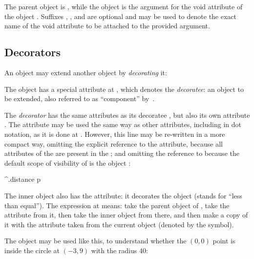 The parent object is , while the object 
is the argument for the void attribute  of the object .
Suffixes , , and  are optional and may be used
to denote the exact name of the void attribute to be attached to the
provided argument.

\subsection{Decorators}

An object may extend another object by \emph{decorating} it:


The object  has a special attribute 
at , which denotes
the \emph{decoratee}: an object to be extended,
also referred to as ``component'' by~\citet{gamma1994design}.

The \emph{decorator} 
has the same attributes as its decoratee , but also
its own attribute . The attribute  may be used
the same way as other attributes, including in dot notation, as it is done
at . However, this line
may be re-written in a more compact way, omitting the explicit
reference to the  attribute, because all attributes
of the  are present in the ;
and omitting the reference to \ff{\$} because the default scope of visibility of
 is the object :

\begin{ffcode}
^.distance p
\end{ffcode}

The inner object  also has the  attribute: it
decorates the object  (stands for ``less than equal'').
The expression at  means:
take the parent object of ,
take the attribute  from it, then take the inner object 
from there, and then make a copy of it with the attribute 
taken from the current object (denoted by the \ff{\$} symbol).

The object  may be used like this, to understand whether
the \((0,0)\) point is inside the circle at \((-3,9)\) with the radius \(40\):

